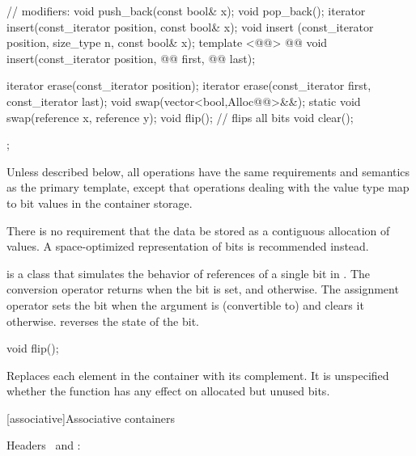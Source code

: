 \documentclass[american,twoside]{book}
\begin{document}
\begin{codeblock}
{{    // modifiers:
    void push_back(const bool& x);
    void pop_back();
    iterator insert(const_iterator position, const bool& x);
    void     insert (const_iterator position, size_type n, const bool& x);
    template <@@>
        @@
        void insert(const_iterator position,
                    @@ first, @@ last);

    iterator erase(const_iterator position);
    iterator erase(const_iterator first, const_iterator last);
    void swap(vector<bool,Alloc@@>&&);
    static void swap(reference x, reference y);
    void flip();                // flips all bits
    void clear();
  };

}
\end{codeblock}%

\pnum
Unless described below, all operations have the same requirements and
semantics as the primary  template, except that operations
dealing with the  value type map to bit values in the
container storage.

\pnum
There is no requirement that the data be stored as a contiguous allocation
of  values. A space-optimized representation of bits is
recommended instead.

\pnum
{}
is a class that simulates the behavior of references of a single bit in
. The conversion operator returns 
when the bit is set, and  otherwise. The assignment operator
sets the bit when the argument is (convertible to)  and
clears it otherwise.  reverses the state of the bit.

\begin{itemdecl}
void flip();
\end{itemdecl}

\begin{itemdescr}
\pnum
\effects Replaces each element in the container with its complement.
It is unspecified whether the function has any effect on allocated but unused bits.
\end{itemdescr}

[associative]{Associative containers}

\pnum
Headers \ and :

%
\end{document}
